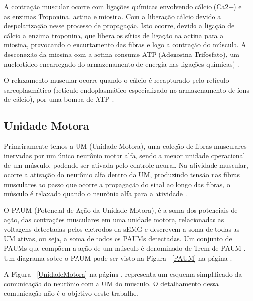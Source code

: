 A contração muscular ocorre com ligações químicas envolvendo cálcio (Ca2+) e as enzimas Troponina, actina e miosina. Com a liberação cálcio devido a despolarização nesse processo de propagação. Isto ocorre, devido a ligação de cálcio a enzima troponina, que libera os sítios de ligação na actina para a miosina, provocando o encurtamento das fibras e logo a contração do músculo. A desconexão da miosina com a actina consume ATP (Adenosina Trifosfato), um nucleotídeo encarregado do armazenamento de energia nas ligações químicas) \cite{da2005detecccao}.

O relaxamento muscular ocorre quando o cálcio é recapturado pelo retículo sarcoplasmático (retículo endoplasmático especializado no armazenamento de íons de cálcio), por uma bomba de ATP \cite{da2005detecccao}. 

\subsection{Unidade Motora}
Primeiramente temos a UM (Unidade Motora), uma coleção de fibras musculares inervadas por um único neurônio motor alfa, sendo a menor unidade operacional de um músculo, podendo ser ativada pelo controle neural. Na atividade muscular, ocorre a ativação do neurônio alfa dentro da UM, produzindo tensão nas fibras musculares ao passo que ocorre a propagação do sinal ao longo das fibras, o músculo é relaxado quando o neurônio alfa para a atividade \cite{yousefi2014characterizing}.

O PAUM (Potencial de Ação da Unidade Motora), é a soma dos potenciais de ação, das contrações musculares em uma unidade motora, relacionadas as voltagens detectadas pelos eletrodos da sEMG e descrevem a soma de todas as UM ativas, ou seja, a soma de todos os PAUMs detectadas. Um conjunto de PAUMs que compõem a ação de um músculo é denominado de Trem de PAUM \cite{yousefi2014characterizing}. Um diagrama sobre o PAUM pode ser visto na Figura ~\ref{PAUM} na página \pageref{PAUM}.

A Figura ~\ref{UnidadeMotora} na página \pageref{UnidadeMotora}, representa um esquema simplificado da comunicação do neurônio com a UM do músculo. O detalhamento dessa comunicação não é o objetivo deste trabalho.

